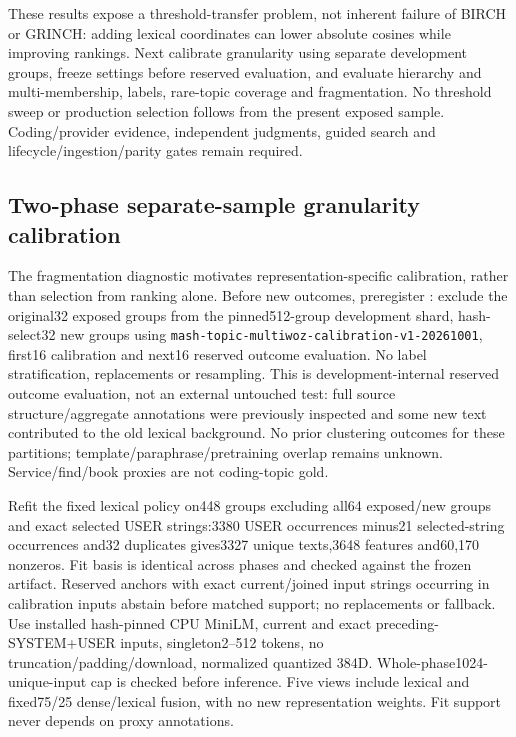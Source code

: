 \documentclass[11pt]{article}
\begin{document}
These results expose a threshold-transfer problem, not inherent failure of BIRCH
or GRINCH: adding lexical coordinates can lower absolute cosines while improving
rankings. Next calibrate granularity using separate development groups, freeze
settings before reserved evaluation, and evaluate hierarchy and multi-membership,
labels, rare-topic coverage and fragmentation. No threshold sweep or production
selection follows from the present exposed sample. Coding/provider evidence,
independent judgments, guided search and lifecycle/ingestion/parity gates remain
required.

\subsection{Two-phase separate-sample granularity calibration}
The fragmentation diagnostic motivates representation-specific calibration,
rather than selection from ranking alone. Before new outcomes, preregister
: exclude the original32 exposed
groups from the pinned512-group development shard, hash-select32 new groups
using \texttt{mash-topic-multiwoz-calibration-v1-20261001}, first16 calibration
and next16 reserved outcome evaluation. No label stratification, replacements
or resampling. This is development-internal reserved outcome evaluation, not an
external untouched test: full source structure/aggregate annotations were
previously inspected and some new text contributed to the old lexical background.
No prior clustering outcomes for these partitions; template/paraphrase/pretraining
overlap remains unknown. Service/find/book proxies are not coding-topic gold.

Refit the fixed lexical policy on448 groups excluding all64 exposed/new groups
and exact selected USER strings:3380 USER occurrences minus21 selected-string
occurrences and32 duplicates gives3327 unique texts,3648 features and60,170
nonzeros. Fit basis is identical across phases and checked against the frozen
artifact. Reserved anchors with exact current/joined input strings occurring
in calibration inputs abstain before matched support; no replacements or fallback.
Use installed hash-pinned CPU MiniLM, current and exact preceding-SYSTEM+USER
inputs, singleton2--512 tokens, no truncation/padding/download, normalized quantized
384D. Whole-phase1024-unique-input cap is checked before inference. Five views
include lexical and fixed75/25 dense/lexical fusion, with no new representation
weights. Fit support never depends on proxy annotations.
\end{document}
